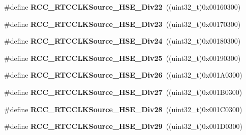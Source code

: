 \begin{DoxyCompactItemize}
\#define {\bfseries R\+C\+C\+\_\+\+R\+T\+C\+C\+L\+K\+Source\+\_\+\+H\+S\+E\+\_\+\+Div22}~((uint32\+\_\+t)0x00160300)
\item 
\mbox{\label{group___r_c_c___r_t_c___clock___source_gaa36a87dd3f1705379438944478db99c9}} 
\#define {\bfseries R\+C\+C\+\_\+\+R\+T\+C\+C\+L\+K\+Source\+\_\+\+H\+S\+E\+\_\+\+Div23}~((uint32\+\_\+t)0x00170300)
\item 
\mbox{\label{group___r_c_c___r_t_c___clock___source_ga184ec0ec3879d6350980be7d1edd9c68}} 
\#define {\bfseries R\+C\+C\+\_\+\+R\+T\+C\+C\+L\+K\+Source\+\_\+\+H\+S\+E\+\_\+\+Div24}~((uint32\+\_\+t)0x00180300)
\item 
\mbox{\label{group___r_c_c___r_t_c___clock___source_gacab9e1957c56e0cff2b2eb082691796f}} 
\#define {\bfseries R\+C\+C\+\_\+\+R\+T\+C\+C\+L\+K\+Source\+\_\+\+H\+S\+E\+\_\+\+Div25}~((uint32\+\_\+t)0x00190300)
\item 
\mbox{\label{group___r_c_c___r_t_c___clock___source_ga537ba53795a13e55675a221f9e2e6eb9}} 
\#define {\bfseries R\+C\+C\+\_\+\+R\+T\+C\+C\+L\+K\+Source\+\_\+\+H\+S\+E\+\_\+\+Div26}~((uint32\+\_\+t)0x001\+A0300)
\item 
\mbox{\label{group___r_c_c___r_t_c___clock___source_gaaf76095713f66ecc4e7a8c8da29eea17}} 
\#define {\bfseries R\+C\+C\+\_\+\+R\+T\+C\+C\+L\+K\+Source\+\_\+\+H\+S\+E\+\_\+\+Div27}~((uint32\+\_\+t)0x001\+B0300)
\item 
\mbox{\label{group___r_c_c___r_t_c___clock___source_gab88a03b8a8333d854fa14d72d9c2fb5e}} 
\#define {\bfseries R\+C\+C\+\_\+\+R\+T\+C\+C\+L\+K\+Source\+\_\+\+H\+S\+E\+\_\+\+Div28}~((uint32\+\_\+t)0x001\+C0300)
\item 
\mbox{\label{group___r_c_c___r_t_c___clock___source_gafab743da30ce0006d62d7f55bd13f82f}} 
\#define {\bfseries R\+C\+C\+\_\+\+R\+T\+C\+C\+L\+K\+Source\+\_\+\+H\+S\+E\+\_\+\+Div29}~((uint32\+\_\+t)0x001\+D0300)
\item 
\mbox{\label{group___r_c_c___r_t_c___clock___source_gaefbdc4c8ec371e4db2e50953bde4ff03}} 

\end{DoxyCompactItemize}
